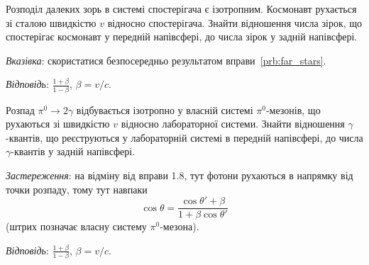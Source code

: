 \begin{problem}
Розподіл далеких зорь в системі спостерігача є ізотропним. Космонавт рухається зі сталою швидкістю $v$ відносно
спостерігача. Знайти відношення числа зірок, що спостерігає космонавт у передній напівсфері, до числа зірок у задній
напівсфері.

\emph{Вказівка}: скористатися безпосередньо результатом вправи~\ref{prb:far_stars}.

\emph{Відповідь}: $\displaystyle \frac{1 + \beta}{1 - \beta}$, $\beta = v/c$.
\end{problem}

\begin{problem}
Розпад $\pi^{0} \rightarrow 2\gamma$ відбувається ізотропно у власній системі $\pi^{0}$-мезонів, що рухаються зі
швидкістю $v$ відносно лабораторної системи. Знайти відношення $\gamma$-квантів, що реєструються у лабораторній системі
в передній напівсфері, до числа $\gamma$-квантів у задній напівсфері.

\emph{Застереження}: на відміну від вправи 1.8, тут фотони рухаються в напрямку від точки розпаду, тому тут навпаки
\[
\cos\theta = \frac{\cos\theta' + \beta}{1 + \beta\cos\theta'}
\]
(штрих позначає власну систему $\pi^{0}$-мезона).

\emph{Відповідь}: $\displaystyle \frac{1 + \beta}{1 - \beta}$, $\beta = v/c$.
\end{problem}
